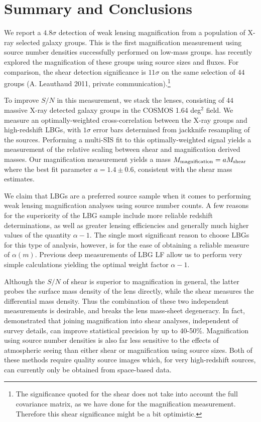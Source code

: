 \section{Summary and Conclusions}
\label{sec:summary2}
We report a $4.8 \sigma$ detection of weak lensing magnification from a population of X-ray selected galaxy groups. This is the first magnification measurement using source number densities successfully performed on low-mass groups. \citet{Schmidt12} has recently explored the magnification of these groups using source sizes and fluxes.  For comparison, the shear detection significance is $11 \sigma$ on the same selection of $44$ groups (A. Leauthaud 2011, private communication).\footnote{The significance quoted for the shear does not take into account the full covariance matrix, as we have done for the magnification measurement.  Therefore this shear significance might be a bit optimistic.}

To improve $S/N$ in this measurement, we stack the lenses, consisting of $44$ massive X-ray detected galaxy groups in the \ac{COSMOS} 1.64 deg$^2$ field.  We measure an optimally-weighted cross-correlation between the X-ray groups and high-redshift \ac{LBG}s, with $1 \sigma$ error bars determined from jackknife resampling of the sources. Performing a multi-\ac{SIS} fit to this optimally-weighted signal yields a measurement of the relative scaling between shear and magnification derived masses. Our magnification measurement yields a mass $M_{\rm magnification}=aM_{\rm shear}$ where the best fit parameter $a=1.4 \pm 0.6$, consistent with the shear mass estimates.

We claim that \ac{LBG}s are a preferred source sample when it comes to performing weak lensing magnification analyses using source number counts.  A few reasons for the superiority of the \ac{LBG} sample include more reliable redshift determinations, as well as greater lensing efficiencies and generally much higher values of the quantity $\alpha-1$.  The single most significant reason to choose \ac{LBG}s for this type of analysis, however, is for the ease of obtaining a reliable measure of $\alpha(m)$.  Previous deep measurements of \ac{LBG} \ac{LF} allow us to perform very simple calculations yielding the optimal weight factor $\alpha-1$.

Although the $S/N$ of shear is superior to magnification in general, the latter probes the surface mass density of the lens directly, while the shear measures the differential mass density.  Thus the combination of these two independent measurements is desirable, and breaks the lens mass-sheet degeneracy. In fact, \citet{RozoSchmidt10} demonstrated that joining magnification into shear analyses, independent of survey details, can improve statistical precision by up to 40-50\%. Magnification using source number densities is also far less sensitive to the effects of atmospheric seeing than either shear or magnification using source sizes.  Both of these methods require quality source images which, for very high-redshift sources, can currently only be obtained from space-based data.

